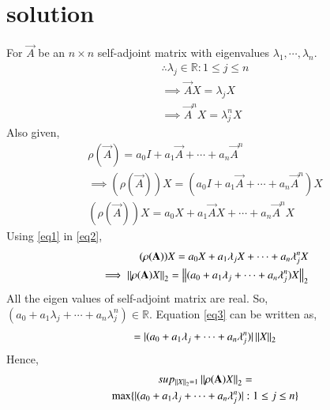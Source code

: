 \documentclass[journal,12pt,twocolumn]{IEEEtran}
\begin{document}
\section{solution}
For $\vec{A}$ be an $n\times n$ self-adjoint matrix with eigenvalues $\lambda_1,\cdots,\lambda_n$.
\begin{align}
\therefore \lambda_j \in \mathbb{R} : 1 \leq j \leq n\\
\implies \vec{A}X=\lambda_j X\\
\implies \vec{A}^n X =\lambda_j^n X \label{eq1}
\end{align}
Also given,
\begin{align}
\rho(\vec{A})=a_0I+a_1\vec{A}+\cdots+a_n\vec{A}^n\\
\implies (\rho(\vec{A}))X=(a_0I+a_1\vec{A}+\cdots+a_n\vec{A}^n)X\\
(\rho(\vec{A}))X=a_0X+a_1\vec{A}X+\cdots+a_n\vec{A}^nX \label{eq2}
\end{align}
Using \ref{eq1} in \ref{eq2},
\begin{align}
(\rho(\mathbf{A}))X=a_0X+a_1 \lambda_j X+\cdots+a_n \lambda_j^nX \\
\implies\left\lVert\rho(\mathbf{A})X\right\rVert_2=\left\lVert(a_0+a_1 \lambda_j +\cdots+a_n \lambda_j^n)X\right\rVert_2 \label{eq3}
\end{align}
All the eigen values of self-adjoint matrix are real. So, 
$(a_0+a_1 \lambda_j +\cdots+a_n \lambda_j^n) \in \mathbb{R}$. Equation \ref{eq3} can be written as, 
\begin{align}
=\lvert (a_0+a_1 \lambda_j +\cdots+a_n \lambda_j^n) \rvert \left\lVert X\right\rVert_2
\end{align}
Hence,
\begin{multline}
sup_{\left\lVert X\right\rVert_{2}=1}\left\lVert\rho(\mathbf{A})X\right\rVert_2= \\
\max\{\lvert (a_0+a_1 \lambda_j +\cdots+a_n \lambda_j^n) \rvert : 1 \leq j \leq n\}
\end{multline}
\end{document}

